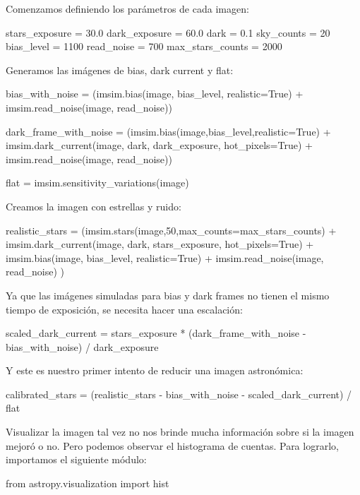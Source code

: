 Comenzamos definiendo los parámetros de cada imagen:
\begin{pyin}
stars_exposure = 30.0
dark_exposure = 60.0
dark = 0.1
sky_counts = 20
bias_level = 1100
read_noise = 700
max_stars_counts = 2000
\end{pyin}

Generamos las imágenes de bias, dark current y flat:

\begin{pyin}
bias_with_noise = (imsim.bias(image, bias_level, realistic=True) + 
                   imsim.read_noise(image, read_noise))

dark_frame_with_noise = (imsim.bias(image,bias_level,realistic=True) + 
                         imsim.dark_current(image, dark, dark_exposure, hot_pixels=True) +
                         imsim.read_noise(image, read_noise))

flat = imsim.sensitivity_variations(image)
\end{pyin}

Creamos la imagen con estrellas y ruido:
\begin{pyin}
realistic_stars = (imsim.stars(image,50,max_counts=max_stars_counts) +
                   imsim.dark_current(image, dark, stars_exposure,  hot_pixels=True) +
                   imsim.bias(image, bias_level, realistic=True) +
                   imsim.read_noise(image, read_noise)
                  )
\end{pyin}

Ya que las imágenes simuladas para bias y dark frames no tienen el mismo tiempo de exposición, se necesita hacer una escalación:

\begin{pyin}
scaled_dark_current = stars_exposure * (dark_frame_with_noise - bias_with_noise) / dark_exposure
\end{pyin}

Y este es nuestro primer intento de reducir una imagen astronómica:

\begin{pyin}
calibrated_stars = (realistic_stars - bias_with_noise - scaled_dark_current) / flat
\end{pyin}

Visualizar la imagen tal vez no nos brinde mucha información sobre si la imagen mejoró o no. Pero podemos observar el histograma de cuentas. Para lograrlo, importamos el siguiente módulo:

\begin{pyin}
from astropy.visualization import hist
\end{pyin}

